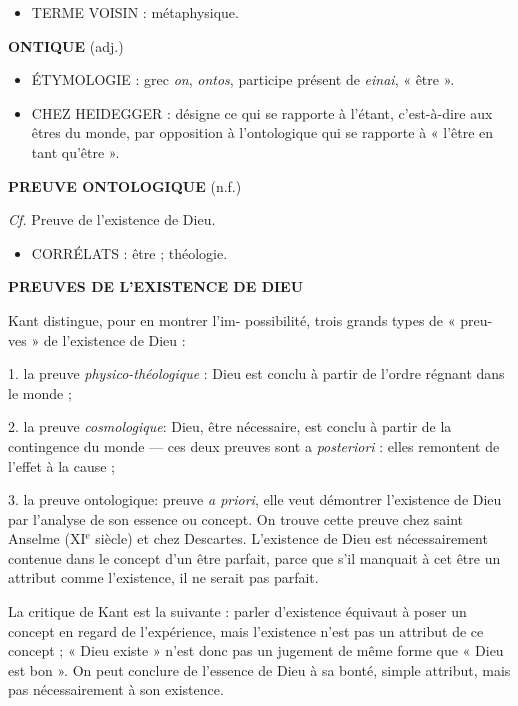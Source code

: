\begin{itemize}[leftmargin=1cm, label=, itemsep=1pt]
\item {\footnotesize TERME VOISIN} : métaphysique.
\end{itemize}

{\bf O{\footnotesize NTIQUE}} (adj.)

\begin{itemize}[leftmargin=1cm, label=, itemsep=1pt]
\item {\footnotesize ÉTYMOLOGIE} : grec {\it on}, {\it ontos}, participe présent de {\it einai}, « être ».
\item {\footnotesize CHEZ HEIDEGGER} : désigne ce qui se rapporte à l'étant, c'est-à-dire aux êtres du monde, par opposition à l'ontologique qui se rapporte à « l'être en tant qu'être ».
\end{itemize}


{\bf P{\footnotesize REUVE ONTOLOGIQUE}} (n.f.)

{\it Cf.} Preuve de l'existence de Dieu.

\begin{itemize}[leftmargin=1cm, label=, itemsep=1pt]
\item {\footnotesize CORRÉLATS} : être ; théologie.
\end{itemize}

{\bf P{\footnotesize REUVES DE L’EXISTENCE DE DIEU}}

Kant distingue, pour en montrer l'im-
possibilité, trois grands types de « preu-
ves » de l'existence de Dieu :

1. la preuve {\it physico-théologique} : Dieu
est conclu à partir de l'ordre régnant
dans le monde ;

2. la preuve {\it cosmologique}: Dieu, être
nécessaire, est conclu à partir de la
contingence du monde — ces deux
preuves sont a {\it posteriori} : elles
remontent de l'effet à la cause ;

3. la preuve {\it }ontologique: preuve {\it a priori}, elle veut démontrer l'existence
de Dieu par l'analyse de son essence ou
concept. On trouve cette preuve chez
saint Anselme ({\footnotesize XI}$^\text{e}$ siècle) et chez Descartes. L'existence de Dieu est nécessairement contenue dans le concept
d'un être parfait, parce que s’il manquait
à cet être un attribut comme l'existence,
il ne serait pas parfait.

La critique de Kant est la suivante : parler d’existence équivaut à poser un
concept en regard de l’expérience, mais
l'existence n’est pas un attribut de ce
concept ; « Dieu existe » n’est donc pas
un jugement de même forme que « Dieu
est bon ». On peut conclure de l'essence
de Dieu à sa bonté, simple attribut, mais
pas nécessairement à son existence.

